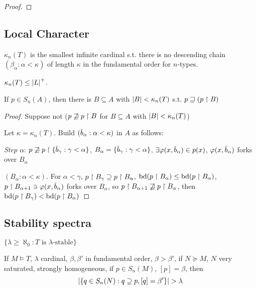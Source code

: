 \documentclass[11pt]{article}
\DeclareMathOperator{\tbd}{bd}
\begin{document}
\begin{proof}

\end{proof}


\subsection{Local Character}
\label{sec:orgaa49155}
\begin{definition}[]
\(\kappa_n(T)\) is the smallest infinite cardinal s.t. there is no descending chain \((\beta_\alpha:\alpha<\kappa)\) of
length \(\kappa\) in the fundamental order for \(n\)-types.
\end{definition}

\begin{remark}
\(\kappa_n(T)\le\abs{L}^+\).
\end{remark}

\begin{proposition}
If \(p\in S_n(A)\), then there is \(B\subseteq A\) with \(\abs{B}<\kappa_n(T)\) s.t. \(p\sqsupseteq(p\upharpoonright B)\)
\end{proposition}

\begin{proof}
Suppose not (\(p\not\sqsupseteq p\upharpoonright B\) for \(B\subseteq A\) with \(\abs{B}<\kappa_n(T)\))

Let \(\kappa=\kappa_n(T)\). Build \((\barb_\alpha:\alpha<\kappa)\) in \(A\) as follows:

\emph{Step
\(\alpha\)}: \(p\not\sqsupseteq p\uhr\{\barb_\gamma:\gamma<\alpha\}\), \(B_\alpha=\{\barb_\gamma:\gamma<\alpha\}\), \(\exists\varphi(x,\barb_\alpha)\in p(x)\), \(\varphi(x,\barb_\alpha)\)
forks over \(B_\alpha\)

\((B_\alpha:\alpha<\kappa)\).
For
\(\alpha<\gamma\),
\(p\upharpoonright B_\gamma\supseteq p\upharpoonright B_\alpha\), \(\tbd(p\uhr B_\alpha)\le\tbd(p\uhr B_\alpha)\), \(p\uhr B_{\alpha+1}\ni\varphi(x,\barb_\alpha)\)
forks over \(B_\alpha\), so \(p\upharpoonright B_{\alpha+1}\not\sqsupseteq p\upharpoonright B_\alpha\), then \(\tbd(p\uhr B_\gamma)<\tbd(p\uhr B_\alpha)\)
\end{proof}

\subsection{Stability spectra}
\label{sec:orge2dc81b}
\(\{\lambda\ge\aleph_0:T\text{ is $\lambda$-stable}\}\)

\begin{lemma}[]
\label{4.28.8.1}
If \(M\vDash T\), \(\lambda\) cardinal, \(\beta,\beta'\)  in fundamental order, \(\beta>\beta'\), if \(N\succeq M\), \(N\) very
saturated, strongly homogeneous, if \(p\in S_n(M)\), \([p]=\beta\), then
\begin{equation*}
\abs{\{q\in S_n(N):q\supseteq p,[q]=\beta'\}}>\lambda
\end{equation*}
\end{lemma}
\end{document}

